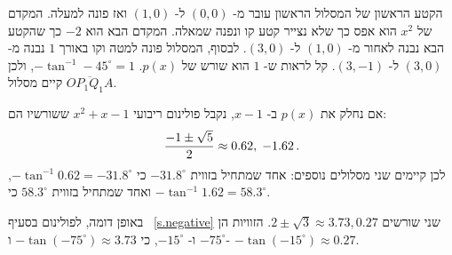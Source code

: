 \begin{center}
\end{center}


הקטע הראשון של המסלול הראשון עובר מ-%
$(0,0)$
ל-%
$(1,0)$
ואז פונה למעלה. המקדם של
$x^2$
הוא אפס כך שלא נצייר קטע קו ונפנה שמאלה. המקדם הבא הוא
$-2$
כך שהקטע הבא נבנה לאחור מ-%
$(1,0)$
ל-%
$(3,0)$.
לבסוף, המסלול פונה למטה וקו באורך 
$1$
נבנה מ-%
$(3,0)$
ל-%
$(3,-1)$.
קל לראות ש-%
$1$
הוא שורש של
$p(x)$.
$-\tan^{-1} -45^\circ=1$,
ולכן קיים מסלול
$\overline{OP_1Q_1A}$.

אם נחלק את
$p(x)$
ב-%
$x-1$,
נקבל פולינום ריבועי
$x^2+x-1$
ששורשיו הם:
\[
\displaystyle\frac{-1\pm\sqrt{5}}{2} \approx 0.62,\; -1.62\,.
\]
לכן קיימים שני מסלולים נוספים: אחד שמתחיל בזווית
$-31.8^\circ$
כי
$-\tan^{-1} 0.62=-31.8^\circ$,
ואחד שמתחיל בזווית
$58.3^\circ$
כי
$-\tan^{-1}1.62=58.3^\circ$.

באופן דומה, לפולינום בסעיף%
~\ref{s.negative}
שני שורשים
$ 2\pm\sqrt{3}\approx 3.73, 0.27$.
הזוויות הן
$-75^\circ$
ו-%
$-15^\circ$,
כי
$-\tan (-75^\circ)\approx 3.73$ 
ו-%
$-\tan (-15^\circ)\approx 0.27$.

